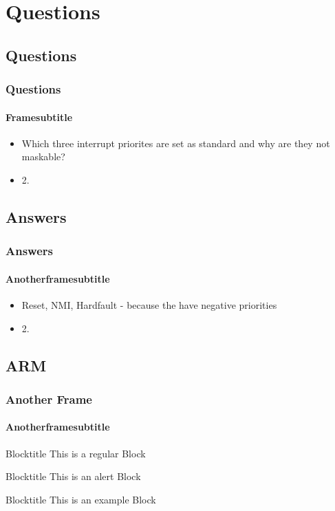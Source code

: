 \section{Questions}
\subsection{Questions}
\begin{frame}
    \frametitle{Questions}
    \framesubtitle{Framesubtitle}
    \begin{itemize}
        \item Which three interrupt priorites are set as standard and why are they not maskable?
        \item 2.
    \end{itemize}
\end{frame}

\subsection{Answers}
\begin{frame}
    \frametitle{Answers}
    \framesubtitle{Anotherframesubtitle}
    \begin{itemize}
        \item Reset, NMI, Hardfault - because the have negative priorities
        \item 2.
    \end{itemize}
\end{frame}

\subsection{ARM}
\begin{frame}
    \frametitle{Another Frame}
    \framesubtitle{Anotherframesubtitle}
    \begin{block}{Blocktitle}
        This is a regular Block
    \end{block}
    \begin{alertblock}{Blocktitle}
        This is an alert Block
    \end{alertblock}
    \begin{exampleblock}{Blocktitle}
        This is an example Block
    \end{exampleblock}
\end{frame}
